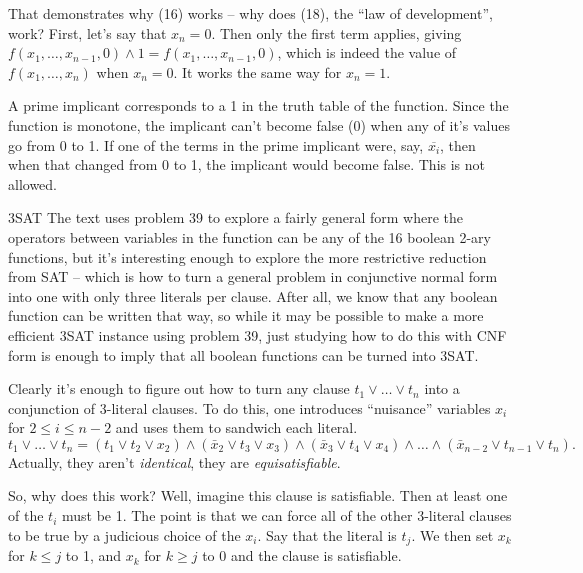 \vskip 0.05in
\noindent [p52] That demonstrates why (16) works -- why does (18), 
the ``law of development'', work?\hfil\break
First, let's say that $x_n = 0$.  Then only the first term applies, giving
$f\left(x_1,\ldots,x_{n-1},0\right) \wedge 1 = f\left(x_1,\ldots,x_{n-1},0\right)$,
which is indeed the value of $f\left( x_1,\ldots,x_n \right)$ when $x_n = 0$.
It works the same way for $x_n = 1$.

\vskip 0.05in \hfil\break 
A prime implicant corresponds to a 1 in the
truth table of the function.  Since the function is monotone, the implicant
can't become false (0) when any of it's values go from 0 to 1.  If one
of the terms in the prime implicant were, say, $\overline{x_i}$, then
when that changed from 0 to 1, the implicant would become false.  This
is not allowed.

\vskip0.1in \hfil\break

\noindent [p56] 3SAT\hfil\break
The text uses problem 39 to explore a fairly general form where the 
operators between variables
in the function can be any of the 16 boolean 2-ary functions, but it's
interesting enough to explore the more restrictive reduction from SAT --
which is how to turn a general problem in conjunctive normal form
into one with only three literals per clause.  After all, we know that
any boolean function can be written that way, so while it may be
possible to make a more efficient 3SAT instance using problem 39,
just studying how to do this with CNF form is enough to imply that
all boolean functions can be turned into 3SAT.

Clearly it's enough to figure out how to turn any clause $t_1 \vee \ldots
\vee t_n$ into a conjunction of 3-literal clauses.  To do this, one introduces
``nuisance'' variables $x_i$ for $2 \leq i \leq n - 2$ and uses them to sandwich
each literal.
$$
t_1 \vee \ldots \vee t_n = \left(t_1 \vee t_2 \vee x_2\right)
\land \left(\bar x_2 \vee t_3 \vee x_3\right)
\land \left(\bar x_3 \vee t_4 \vee x_4\right)
\land \ldots \land \left(\bar x_{n-2} \vee t_{n-1} \vee t_n\right) .
$$
Actually, they aren't {\it identical}, they are {\it equisatisfiable}.

So, why does this work?  Well, imagine this clause is satisfiable.
Then at least one of the $t_i$ must be 1. 
The point is that we can force all of the other 3-literal clauses
to be true by a judicious choice of the $x_i$.   Say that the
literal is $t_j$.  We then set $x_k$ for $k \le j$ to 1,
and $x_k$ for $k \geq j$ to 0 and the clause is satisfiable.

